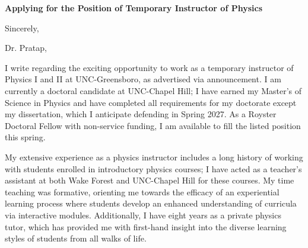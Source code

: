 

\clearpage
 
\date{\today} %
\opening{\textbf{Applying for the Position of Temporary Instructor of Physics}} %
\closing{Sincerely,} %


\makelettertitle
Dr. Pratap, \par 
I write regarding the exciting opportunity to work as a temporary instructor of Physics I and II at UNC-Greensboro, as advertised via announcement. I am currently a doctoral candidate at UNC-Chapel Hill; I have earned my Master's of Science in Physics and have completed all requirements for my doctorate except my dissertation, which I anticipate defending in Spring 2027. As a Royster Doctoral Fellow with non-service funding, I am available to fill the listed position this spring. \par
My extensive experience as a physics instructor includes a long history of working with students enrolled in introductory physics courses; I have acted as a teacher's assistant at both Wake Forest and UNC-Chapel Hill for these courses. My time teaching was formative, orienting me towards the efficacy of an experiential learning process where students develop an enhanced understanding of curricula via interactive modules. Additionally, I have eight years as a private physics tutor, which has provided me with first-hand insight into the diverse learning styles of students from all walks of life. \par

